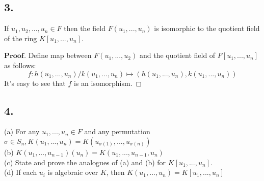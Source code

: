 \documentclass[a4paper, 11pt]{article}
\newenvironment{myprf}
{\renewcommand\qedsymbol{$ $}\begin{proof}[$\mathbf{Proof}$]}
  {\end{proof}}
\begin{document}
\subsection*{3.}
\noindent If $u_1,u_2,...,u_n\in F$ then the field $F(u_1,...,u_n)$ is isomorphic to the 
quotient field of the ring $K[u_1,...,u_n]$.
\begin{myprf}
        Define map between $F(u_1,...,u_2)$ and the quotient field of $F[u_1,...,u_n]$
        as follows:
        $$
        f: h(u_1,...,u_n)/k(u_1,...,u_n) \mapsto (h(u_1,...,u_n), k(u_1,...,u_n))
        $$It's easy to see that $f$ is an isomorphism.
\end{myprf}

\subsection*{4.}
\noindent
(a) For any $u_1,...,u_n\in F$ and any permutation $\sigma \in S_n,K(u_1,...,u_n)
    = K(u_{\sigma(1)},...,u_{\sigma(n)})$\\
    (b) $K(u_1,...,u_{n-1})(u_n)=K(u_1,...,u_{n-1}, u_n)$\\
    (c) State and prove the analogues of (a) and (b) for $K[u_1,...,u_n]$.\\
    (d) If each $u_i$ is algebraic over $K$, then $K(u_1,...,u_n)=K[u_1,...,u_n]$\\
\end{document}
